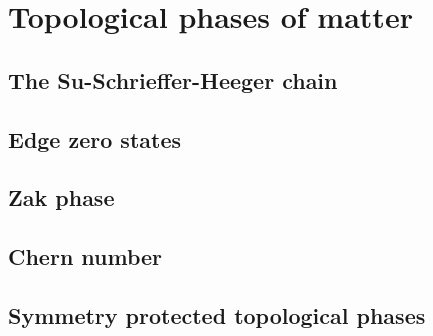 \chapter{Topological phases of matter}
\label{ch:topological_phases_of_matter}
%
%
\section{The Su-Schrieffer-Heeger chain}
\label{sec:the_SSH_chain}
%
%
\section{Edge zero states}
\label{sec:edge_zero_states}
%
%
\section{Zak phase}
\label{sec:zak_phase}
%
%
\section{Chern number}
\label{sec:chern_number}
%
%
\section{Symmetry protected topological phases}
\label{sec:symmetry_protected_topological_phases}
